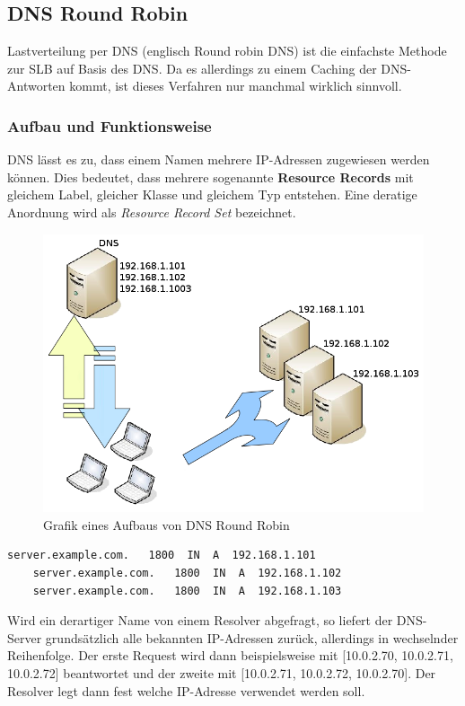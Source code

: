 \newpage
\subsection{DNS Round Robin}\cite{LastverteilungPerDNS}
\label{RoundRobin}

Lastverteilung per DNS (englisch Round robin DNS) ist die einfachste Methode zur SLB auf Basis des DNS. Da es allerdings zu einem Caching der DNS-Antworten kommt, ist dieses Verfahren nur manchmal wirklich sinnvoll.

\subsubsection{Aufbau und Funktionsweise}\cite{RoundRobinDNS}
DNS lässt es zu, dass einem Namen mehrere IP-Adressen zugewiesen werden können. Dies bedeutet, dass mehrere sogenannte \textbf{Resource Records} mit gleichem Label, gleicher Klasse und gleichem Typ entstehen. Eine deratige Anordnung wird als \textit{Resource Record Set} bezeichnet.

\begin{figure}[!h]
	\begin{center}
		\includegraphics[width=0.5\linewidth]{images/RR-DNS}
		\caption{Grafik eines Aufbaus von DNS Round Robin}
		\label{broker}
	\end{center}
\end{figure}
\begin{center}

\begin{lstlisting}[caption=DNS Round Robin Example]
    server.example.com.   1800  IN  A  192.168.1.101
    server.example.com.   1800  IN  A  192.168.1.102
    server.example.com.   1800  IN  A  192.168.1.103
\end{lstlisting}
\end{center}
Wird ein derartiger Name von einem Resolver abgefragt, so liefert der DNS-Server grundsätzlich alle bekannten IP-Adressen zurück, allerdings in wechselnder Reihenfolge. Der erste Request wird dann beispielsweise mit [10.0.2.70, 10.0.2.71, 10.0.2.72] beantwortet und der zweite mit [10.0.2.71, 10.0.2.72, 10.0.2.70]. Der Resolver legt dann fest welche IP-Adresse verwendet werden soll.


